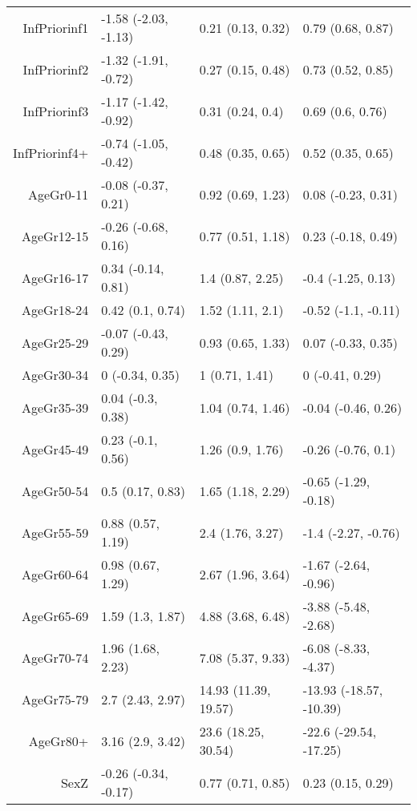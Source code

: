 \begin{table}[ht]
\begin{tabular}{rlll}
  InfPriorinf1 & -1.58 (-2.03, -1.13) & 0.21 (0.13, 0.32) & 0.79 (0.68, 0.87) \\ 
  InfPriorinf2 & -1.32 (-1.91, -0.72) & 0.27 (0.15, 0.48) & 0.73 (0.52, 0.85) \\ 
  InfPriorinf3 & -1.17 (-1.42, -0.92) & 0.31 (0.24, 0.4) & 0.69 (0.6, 0.76) \\ 
  InfPriorinf4+ & -0.74 (-1.05, -0.42) & 0.48 (0.35, 0.65) & 0.52 (0.35, 0.65) \\ 
  AgeGr0-11 & -0.08 (-0.37, 0.21) & 0.92 (0.69, 1.23) & 0.08 (-0.23, 0.31) \\ 
  AgeGr12-15 & -0.26 (-0.68, 0.16) & 0.77 (0.51, 1.18) & 0.23 (-0.18, 0.49) \\ 
  AgeGr16-17 & 0.34 (-0.14, 0.81) & 1.4 (0.87, 2.25) & -0.4 (-1.25, 0.13) \\ 
  AgeGr18-24 & 0.42 (0.1, 0.74) & 1.52 (1.11, 2.1) & -0.52 (-1.1, -0.11) \\ 
  AgeGr25-29 & -0.07 (-0.43, 0.29) & 0.93 (0.65, 1.33) & 0.07 (-0.33, 0.35) \\ 
  AgeGr30-34 & 0 (-0.34, 0.35) & 1 (0.71, 1.41) & 0 (-0.41, 0.29) \\ 
  AgeGr35-39 & 0.04 (-0.3, 0.38) & 1.04 (0.74, 1.46) & -0.04 (-0.46, 0.26) \\ 
  AgeGr45-49 & 0.23 (-0.1, 0.56) & 1.26 (0.9, 1.76) & -0.26 (-0.76, 0.1) \\ 
  AgeGr50-54 & 0.5 (0.17, 0.83) & 1.65 (1.18, 2.29) & -0.65 (-1.29, -0.18) \\ 
  AgeGr55-59 & 0.88 (0.57, 1.19) & 2.4 (1.76, 3.27) & -1.4 (-2.27, -0.76) \\ 
  AgeGr60-64 & 0.98 (0.67, 1.29) & 2.67 (1.96, 3.64) & -1.67 (-2.64, -0.96) \\ 
  AgeGr65-69 & 1.59 (1.3, 1.87) & 4.88 (3.68, 6.48) & -3.88 (-5.48, -2.68) \\ 
  AgeGr70-74 & 1.96 (1.68, 2.23) & 7.08 (5.37, 9.33) & -6.08 (-8.33, -4.37) \\ 
  AgeGr75-79 & 2.7 (2.43, 2.97) & 14.93 (11.39, 19.57) & -13.93 (-18.57, -10.39) \\ 
  AgeGr80+ & 3.16 (2.9, 3.42) & 23.6 (18.25, 30.54) & -22.6 (-29.54, -17.25) \\ 
  SexZ & -0.26 (-0.34, -0.17) & 0.77 (0.71, 0.85) & 0.23 (0.15, 0.29) \\ 
   \hline
\end{tabular}
\end{table}
